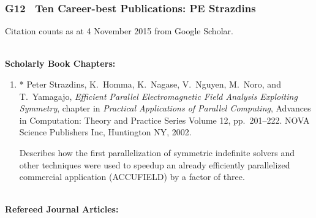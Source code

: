 \documentclass[a4paper,oneside,12pt]{article}
\begin{document}
\subsubsection*{G12~ Ten Career-best Publications: PE Strazdins}

Citation counts as at 4 November 2015 from Google Scholar.

\setlength{\leftmargini}{8mm}
~ \\
\textbf{Scholarly Book Chapters:}
\begin{enumerate}
\item * {Peter Strazdins}, K.\ Homma, K.\ Nagase, V.\ Nguyen, M.\
      Noro, and T.\ Yamagajo,
{\em Efficient {P}arallel {E}lectromagnetic {F}ield {A}nalysis
      {E}xploiting {S}ymmetry},
	chapter in {\em Practical Applications of Parallel Computing},
      Advances in Computation: Theory and Practice Series Volume 12,
      pp.\ 201--222. NOVA Science Publishers Inc, Huntington NY,
      2002. 

Describes how the first parallelization of symmetric
indefinite solvers and other techniques were used to speedup an already
efficiently parallelized commercial application (ACCUFIELD) by a factor
of three. 

\end{enumerate}
~\\[-2mm]
\textbf{Refereed Journal Articles:}
\end{document}
